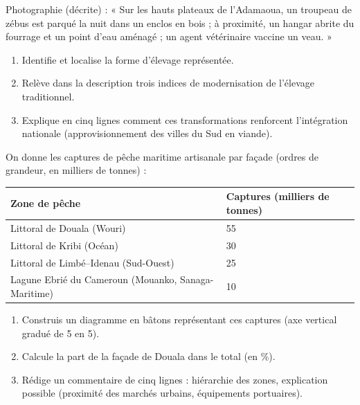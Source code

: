 \documentclass[11pt]{article}
\begin{document}
\begin{exercice}
Photographie (décrite) : « Sur les hauts plateaux de l'Adamaoua, un troupeau de zébus est parqué la nuit dans un enclos en bois ; à proximité, un hangar abrite du fourrage et un point d'eau aménagé ; un agent vétérinaire vaccine un veau. »

\begin{enumerate}
\item Identifie et localise la forme d'élevage représentée.
\item Relève dans la description trois indices de modernisation de l'élevage traditionnel.
\item Explique en cinq lignes comment ces transformations renforcent l'intégration nationale (approvisionnement des villes du Sud en viande).
\end{enumerate}
\end{exercice}

\begin{exercice}
On donne les captures de pêche maritime artisanale par façade (ordres de grandeur, en milliers de tonnes) :

\begin{center}
\begin{tabularx}{\linewidth}{|l|X|}\hline
\rowcolor{popblueL} \textbf{Zone de pêche} & \textbf{Captures (milliers de tonnes)} \\ \hline
Littoral de Douala (Wouri) & 55 \\ \hline
Littoral de Kribi (Océan) & 30 \\ \hline
Littoral de Limbé--Idenau (Sud-Ouest) & 25 \\ \hline
Lagune Ebrié du Cameroun (Mouanko, Sanaga-Maritime) & 10 \\ \hline
\end{tabularx}
\end{center}

\begin{enumerate}
\item Construis un diagramme en bâtons représentant ces captures (axe vertical gradué de 5 en 5).
\item Calcule la part de la façade de Douala dans le total (en \%).
\item Rédige un commentaire de cinq lignes : hiérarchie des zones, explication possible (proximité des marchés urbains, équipements portuaires).
\end{enumerate}
\end{exercice}
\end{document}
